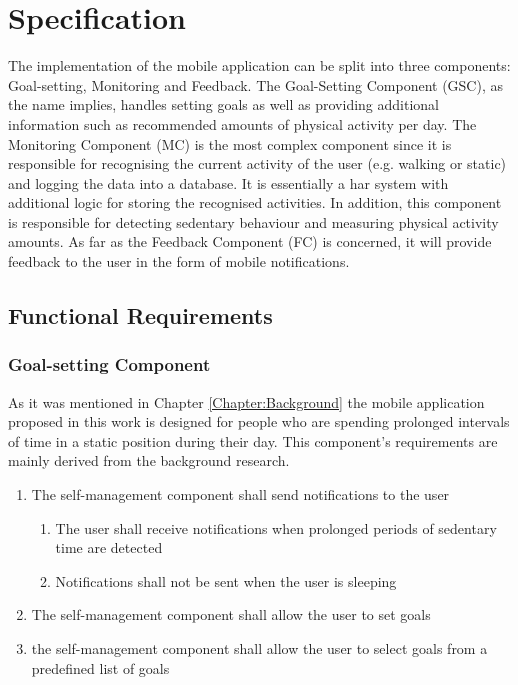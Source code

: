 \chapter{Specification}
\label{Chapter:Specification}

The implementation of the mobile application can be split into three components: Goal-setting, Monitoring and Feedback. The Goal-Setting Component (GSC), as the name implies, handles setting goals as well as providing additional information such as recommended amounts of physical activity per day. The Monitoring Component (MC) is the most complex component since it is responsible for recognising the current activity of the user (e.g. walking or static) and logging the data into a database. It is essentially a \gls{har} system with additional logic for storing the recognised activities. In addition, this component is responsible for detecting sedentary behaviour and measuring physical activity amounts. As far as the Feedback Component (FC) is concerned, it will provide feedback to the user in the form of mobile notifications. 
\section{Functional Requirements}

    \subsection{Goal-setting Component}
    As it was mentioned in Chapter \ref{Chapter:Background} the mobile application proposed in this work is designed for people who are spending prolonged intervals of time in a static position during their day. This component's requirements are mainly derived from the background research. 
    
    \begin{enumerate}
        \item The self-management component shall send notifications to the user
        \begin{enumerate}
            \item The user shall receive notifications when prolonged periods of sedentary time are detected 
            \item Notifications shall not be sent when the user is sleeping
        \end{enumerate}
        \item The self-management component shall allow the user to set goals
        \item the self-management component shall allow the user to select goals from a predefined list of goals
    \end{enumerate}
    
